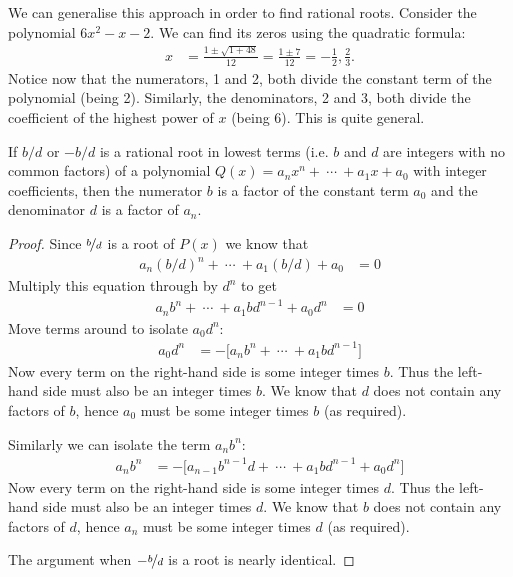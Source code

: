 We can generalise this approach in order to find rational roots. Consider the polynomial
$6x^2-x-2$. We can find its zeros using the quadratic formula:
\begin{align*}
 x &= \frac{1 \pm \sqrt{1 + 48}}{12} = \frac{1\pm 7}{12} = -\frac{1}{2}, \frac{2}{3}.
\end{align*}
Notice now that the numerators, 1 and 2, both divide the constant term of the polynomial
(being 2). Similarly, the denominators, 2 and 3, both divide the coefficient of the
highest power of $x$ (being 6). This is quite general.

\begin{trick}
If $b/d$ or $-b/d$ is a rational root in lowest terms (i.e. $b$ and $d$
are integers with no common factors) of a polynomial
$Q(x) = a_nx^n+\ \cdots\ +a_1x+a_0$ with integer coefficients, then the numerator
$b$ is a factor of the constant term $a_0$ and the denominator $d$ is a
factor of $a_n$.
\end{trick}

\begin{proof}
Since $\nicefrac{b}{d}$ is a root of $P(x)$ we know that
\begin{align*}
a_n(b/d)^n+\ \cdots\ +a_1(b/d)+a_0 &=0
\end{align*}
Multiply this equation through by $d^n$ to get
\begin{align*}
a_n b^n+\ \cdots\ +a_1 b d^{n-1}+a_0d^n &=0
\end{align*}
Move terms around to isolate $a_0 d^n$:
\begin{align*}
  a_0d^n &= - \big[ a_n b^n+\ \cdots\ +a_1 b d^{n-1} \big]
\end{align*}
Now every term on the right-hand side is some integer times $b$. Thus the left-hand side
must also be an integer times $b$. We know that $d$ does not contain any factors of $b$,
hence $a_0$ must be some integer times $b$ (as required).

Similarly we can isolate the term $a_n b^n$:
\begin{align*}
  a_n b^n &= - \big[ a_{n-1} b^{n-1}d+\ \cdots\ +a_1 b d^{n-1} + a_0 d^n \big]
\end{align*}
Now every term on the right-hand side is some integer times $d$. Thus the left-hand side
must also be an integer times $d$. We know that $b$ does not contain any factors of $d$,
hence $a_n$ must be some integer times $d$ (as required).

The argument when $-\nicefrac{b}{d}$ is a root is nearly identical.
\end{proof}


